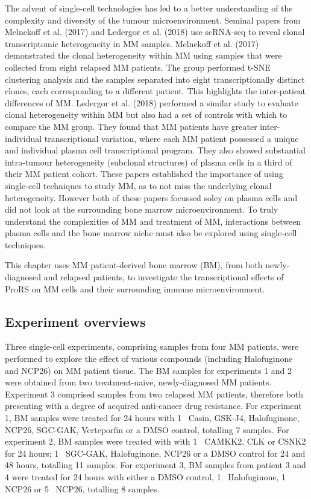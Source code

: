 The advent of single-cell technologies has led to a better understanding of the complexity and diversity of the tumour microenvironment.
Seminal papers from Melnekoff et al. (2017)\cite{melnekoff2017single} and Ledergor et al. (2018)\cite{ledergor2018single} use scRNA-seq to reveal clonal transcriptomic heterogeneity in MM samples.
Melnekoff et al. (2017) demonstrated the clonal heterogeneity within MM using samples that were collected from eight relapsed MM patients.
The group performed t-SNE clustering analysis and the samples separated into eight transcriptionally distinct clones, each corresponding to a different patient.
This highlights the inter-patient differences of MM\@.
Ledergor et al. (2018) performed a similar study to evaluate clonal heterogeneity within MM but also had a set of controls with which to compare the MM group.
They found that MM patients have greater inter-individual transcriptional variation, where each MM patient possessed a unique and individual plasma cell transcriptional program.
They also showed substantial intra-tumour heterogeneity (subclonal structures) of plasma cells in a third of their MM patient cohort.
These papers established the importance of using single-cell techniques to study MM, as to not miss the underlying clonal heterogeneity.
However both of these papers focussed soley on plasma cells and did not look at the surrounding bone marrow microenvironment.
To truly understand the complexities of MM and treatment of MM, interactions between plasma cells and the bone marrow niche must also be explored using single-cell techniques.

This chapter uses MM patient-derived bone marrow (BM), from both newly-diagnosed and relapsed patients, to investigate the transcriptional effects of ProRS on MM cells and their surrounding immune microenvironment.

\subsection{Experiment overviews}\label{subsec:scrna_experiment}
Three single-cell experiments, comprising samples from four MM patients, were performed to explore the effect of various compounds (including Halofuginone and NCP26) on MM patient tissue.
The BM samples for experiments 1 and 2 were obtained from two treatment-naive, newly-diagnosed MM patients.
Experiment 3 comprised samples from two relapsed MM patients, therefore both presenting with a degree of acquired anti-cancer drug resistance.
For experiment 1, BM samples were treated for 24 hours with 1\si{\micro\Molar} Casin, GSK-J4, Halofuginone, NCP26, SGC-GAK, Verteporfin or a DMSO control, totalling 7 samples.
For experiment 2, BM samples were treated with with 1\si{\micro\Molar} CAMKK2, CLK or CSNK2 for 24 hours; 1\si{\micro\Molar} SGC-GAK, Halofuginone, NCP26 or a DMSO control for 24 and 48 hours, totalling 11 samples.
For experiment 3, BM samples from patient 3 and 4 were treated for 24 hours with either a DMSO control, 1\si{\micro\Molar} Halofuginone, 1\si{\micro\Molar} NCP26 or 5\si{\micro\Molar} NCP26, totalling 8 samples.

